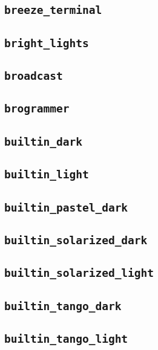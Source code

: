 \subsection{\texttt{breeze\_terminal}}
\newpage
\subsection{\texttt{bright\_lights}}
\newpage
\subsection{\texttt{broadcast}}
\newpage
\subsection{\texttt{brogrammer}}
\newpage
\subsection{\texttt{builtin\_dark}}
\newpage
\subsection{\texttt{builtin\_light}}
\newpage
\subsection{\texttt{builtin\_pastel\_dark}}
\newpage
\subsection{\texttt{builtin\_solarized\_dark}}
\newpage
\subsection{\texttt{builtin\_solarized\_light}}
\newpage
\subsection{\texttt{builtin\_tango\_dark}}
\newpage
\subsection{\texttt{builtin\_tango\_light}}
\newpage
